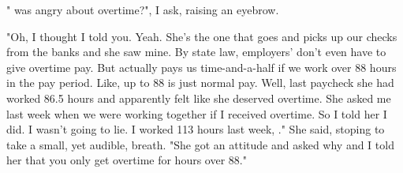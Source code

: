 "\jasmine{} was angry about overtime?", I ask, raising an eyebrow.
\VV


"Oh, I thought I told you.
Yeah. She's the one that goes and picks up our checks from the banks
and she saw mine.  By state law, employers' don't even have to
give overtime pay.  But \mike{} actually pays us time-and-a-half if
we work over 88 hours in the pay period.
Like, up to 88 is just normal pay.
Well, last paycheck she had worked 86.5 hours and apparently felt like
she deserved overtime.  She asked me last week when we were working together
if I received overtime.  So I told her I did.  I wasn't going to lie.
I worked 113 hours last week, \josh."
She said, stoping to take a small, yet audible, breath.
"She got an attitude and asked why and I told her that you only get overtime
for hours over 88."







